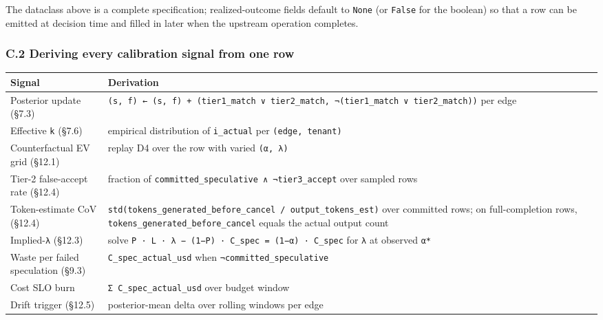 \documentclass[
  11pt,
]{article}
\newcounter{none} %
\begin{document}
The dataclass above is a complete specification; realized-outcome fields
default to \texttt{None} (or \texttt{False} for the boolean) so that a
row can be emitted at decision time and filled in later when the
upstream operation completes.

\subsubsection{C.2 Deriving every calibration signal from one
row}\label{c.2-deriving-every-calibration-signal-from-one-row}

{\def\LTcaptype{none} %
\begin{longtable}[]{@{}
  >{\raggedright\arraybackslash}p{}
  >{\raggedright\arraybackslash}p{}@{}}
\toprule\noalign{}
\begin{minipage}[b]{\linewidth}\raggedright
Signal
\end{minipage} & \begin{minipage}[b]{\linewidth}\raggedright
Derivation
\end{minipage} \\
\midrule\noalign{}
\endhead
\bottomrule\noalign{}
\endlastfoot
Posterior update (§7.3) &
\texttt{(s,\ f)\ ←\ (s,\ f)\ +\ (tier1\_match\ ∨\ tier2\_match,\ ¬(tier1\_match\ ∨\ tier2\_match))}
per edge \\
Effective \texttt{k} (§7.6) & empirical distribution of
\texttt{i\_actual} per \texttt{(edge,\ tenant)} \\
Counterfactual EV grid (§12.1) & replay D4 over the row with varied
\texttt{(α,\ λ)} \\
Tier-2 false-accept rate (§12.4) & fraction of
\texttt{committed\_speculative\ ∧\ ¬tier3\_accept} over sampled rows \\
Token-estimate CoV (§12.4) &
\texttt{std(tokens\_generated\_before\_cancel\ /\ output\_tokens\_est)}
over committed rows; on full-completion rows,
\texttt{tokens\_generated\_before\_cancel} equals the actual output
count \\
Implied-\texttt{λ} (§12.3) & solve
\texttt{P\ ·\ L\ ·\ λ\ −\ (1−P)\ ·\ C\_spec\ =\ (1−α)\ ·\ C\_spec} for
\texttt{λ} at observed \texttt{α*} \\
Waste per failed speculation (§9.3) & \texttt{C\_spec\_actual\_usd} when
\texttt{¬committed\_speculative} \\
Cost SLO burn & \texttt{Σ\ C\_spec\_actual\_usd} over budget window \\
Drift trigger (§12.5) & posterior-mean delta over rolling windows per
edge \\
\end{longtable}
}
\end{document}
